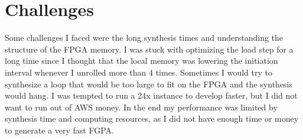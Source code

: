 \documentclass[12pt]{article}
\begin{document}
\section{Challenges}

Some challenges I faced were the long synthesis times and understanding the structure of the FPGA memory. I was
stuck with optimizing the load step for a long time since I thought that the local memory was lowering the initiation
interval whenever I unrolled more than 4 times. Sometimes I would try to synthesize a loop that would be too large to fit
on the FPGA and the synthesis would hang. I was tempted to run a 24x instance to develop faster, but I did not want to
run out of AWS money. In the end my performance was limited by synthesis time and computing resources, as I
did not have enough time or money to generate a very fast FGPA.
\end{document}
